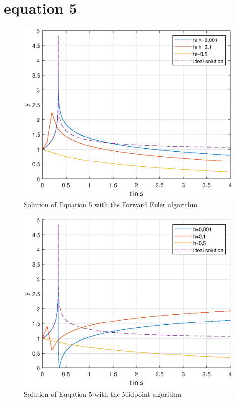 \section{equation 5}
\begin{figure}[H]
    \centering
    \includegraphics[width=\plotwidth]{plots/fe_only_equation_5.eps}
    \caption{Solution of Equation 5 with the Forward Euler algorithm}
    \label{fig:eq5_fe_only}
\end{figure}

\begin{figure}[H]
    \centering
    \includegraphics[width=\plotwidth]{plots/rk_only_equation_5.eps}
    \caption{Solution of Euqation 5 with the Midpoint algorithm}
    \label{fig:eq5_rk_only}
\end{figure}

